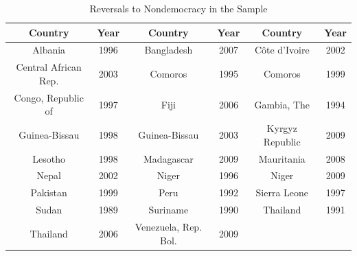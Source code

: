 \begin{appendix}
\begin{table}[h!]
    \caption{Reversals to Nondemocracy in the Sample}\label{nondemo}
\centering
\begin{tabular}{c c c c c c}
\hline
Country & Year & Country & Year & Country & Year \\
\hline
Albania & 1996 & Bangladesh & 2007 & Côte d'Ivoire & 2002 \\
Central African Rep. & 2003 & Comoros & 1995 & Comoros & 1999 \\
Congo, Republic of & 1997 & Fiji & 2006 & Gambia, The & 1994 \\
Guinea-Bissau & 1998 & Guinea-Bissau & 2003 & Kyrgyz Republic & 2009 \\
Lesotho & 1998 & Madagascar & 2009 & Mauritania & 2008 \\
Nepal & 2002 & Niger & 1996 & Niger & 2009 \\
Pakistan & 1999 & Peru & 1992 & Sierra Leone & 1997 \\
Sudan & 1989 & Suriname & 1990 & Thailand & 1991 \\
Thailand & 2006 & Venezuela, Rep. Bol. & 2009 & & \\
\hline
\end{tabular}
\end{table}


\end{appendix}
